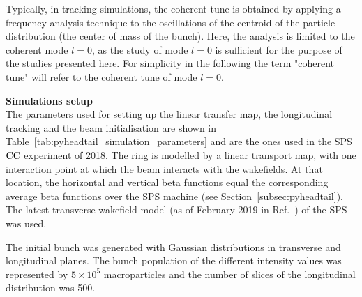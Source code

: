 Typically, in tracking simulations, the coherent tune is obtained by applying a frequency analysis technique to the oscillations of the centroid of the particle distribution (the center of mass of the bunch). Here, the analysis is limited to the coherent mode $l=0$, %
as the study of mode $l=0$ is sufficient for the purpose of the studies presented here. For simplicity in the following the term "coherent tune" will refer to the coherent tune of mode $l=0$.

\textbf{Simulations setup}\\
The parameters used for setting up the linear transfer map, the longitudinal tracking and the beam initialisation are shown in Table~\ref{tab:pyheadtail_simulation_parameters} and are the ones used in the SPS ${\mathrm{CC}}$ experiment of 2018. The ring is modelled by a linear transport map, with one interaction point at which the beam interacts with the wakefields. At that location, the horizontal and vertical beta functions equal the corresponding average beta functions over the SPS machine (see Section~\ref{subsec:pyheadtail}). The latest transverse wakefield model (as of February 2019 in Ref.~\cite{sps_impedance_model_git}) of the SPS was used.

The initial bunch was generated with Gaussian distributions in transverse and longitudinal planes. The bunch population of the different intensity values was represented by $5 \times 10^5$ macroparticles and the number of slices of the longitudinal distribution was 500.

